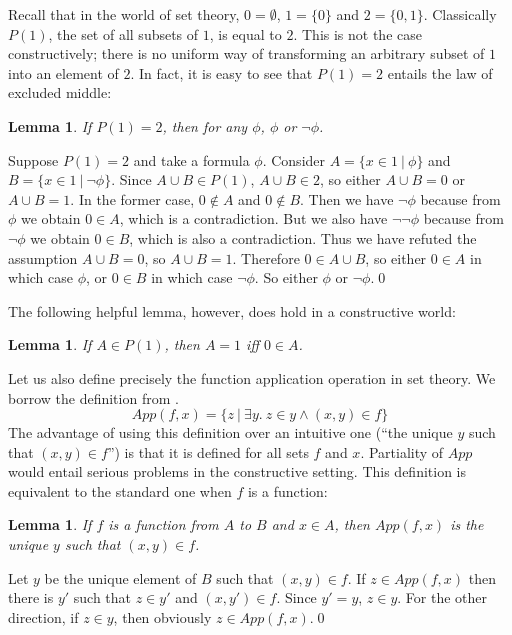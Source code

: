 \documentclass{LMCS}
\newtheorem{lemma}[thm]{Lemma}
\newcommand{\ignore}[1]{}
\newcommand{\Prop}{\ensuremath{P(1)}}
\begin{document}
Recall that in the world of set theory, $0 = \emptyset$, $1 = \{ 0 \}$ and $2 = \{ 0, 1 \}$.
Classically $\Prop$, the set of all subsets of $1$, is equal to $2$. This is not the case constructively; there is no
uniform way of transforming an arbitrary subset of $1$ into an element
of $2$. In fact, it is easy to see that $P(1) = 2$ entails the law of excluded
middle:
\begin{lemma}
If $\Prop = 2$, then for any $\phi$, $\phi$ or $\lnot \phi$.
\end{lemma}
\proof
Suppose $\Prop = 2$ and take a formula $\phi$. Consider $A = \{ x \in 1\ |\ \phi \}$ and $B
= \{ x \in 1\ |\ \lnot \phi \}$. Since $A \cup B \in \Prop$, $A \cup B \in 2$,
so either $A \cup B = 0$ or $A \cup B = 1$. In the former case, $0 \notin A$
and $0 \notin B$. Then we have $\lnot \phi$ because from $\phi$ we obtain $0 \in
A$, which is a contradiction. But we also have $\lnot \lnot \phi$ because from $\lnot
\phi$ we obtain $0 \in B$, which is also a contradiction. Thus we have refuted the assumption $
A \cup B=0$, so $A \cup B = 1$. Therefore $0 \in A \cup B$, so either $0 \in A$ in which case $\phi$, or $0 \in B$ in which case $\lnot \phi$. So either $\phi$ or
$\lnot \phi$.\qed


The following helpful lemma, however, does hold in a constructive world:
\begin{lemma}\label{lp01}
If $A \in P(1)$, then $A = 1$ iff $0 \in A$. 
\end{lemma}
\ignore
{
\proof
Left-to-right direction is immediate, for right-to-left we have $A \subseteq
1$ and need to show that $1 \subseteq A$. Suppose $B \in 1$, then $B = 0$,
but $0 \in A$, so $B \in A$.\qed
}
Let us also define precisely the function application operation in set theory. We borrow the definition from 
\cite{Acz99a}. 
\[
App(f, x) = \{ z\ |\ \exists y.\ z \in y \land (x, y) \in f \}
\]
The advantage of using this definition over an intuitive one (``the unique $y$ such that $(x, y) \in f$'') is 
that it is defined for all sets $f$ and $x$. Partiality of $App$ would
entail serious problems in the constructive setting.
This definition is equivalent to the standard one when $f$ is a function:
\begin{lemma}
If $f$ is a function from $A$ to $B$ and $x \in A$, then $App(f, x)$ is the
unique $y$ such that $(x, y) \in f$. 
\end{lemma}
\proof
Let $y$ be the unique element of $B$ such that $(x, y) \in f$.
If $z \in App(f, x)$ then there is $y'$ such that $z \in y'$ and $(x, y')
\in f$. Since $y' = y$, $z \in y$. For the other direction, if $z \in y$,
then obviously $z \in App(f, x)$.\qed
\end{document}
